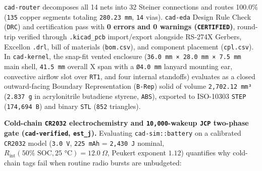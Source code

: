 \documentclass[10pt,letterpaper]{article}
\begin{document}
\texttt{cad-router} decomposes all 14 nets into 32 Steiner connections
and routes 100.0\% (\texttt{135} copper segments totaling
\texttt{280.23\ mm}, \texttt{14} vias). \texttt{cad-eda} Design Rule
Check (\texttt{DRC}) and certification pass with \textbf{0 errors and 0
warnings (\texttt{CERTIFIED})}, round-trip verified through
\texttt{.kicad\_pcb} import/export alongside RS-274X Gerbers, Excellon
\texttt{.drl}, bill of materials (\texttt{bom.csv}), and component
placement (\texttt{cpl.csv}). In \texttt{cad-kernel}, the snap-fit
vented enclosure (\texttt{36.\allowbreak{}0\ mm\ ×\ 28.\allowbreak{}0\ mm\ ×\ 7.\allowbreak{}5\ mm} main shell,
\texttt{41.5\ mm} overall X span with a \texttt{Ø4.0\ mm} lanyard
mounting ear, convective airflow slot over \texttt{RT1}, and four
internal standoffs) evaluates as a closed outward-facing Boundary
Representation (\texttt{B-Rep}) solid of volume \texttt{2,702.12\ mm³}
(\texttt{2.837\ g} in acrylonitrile butadiene styrene, \texttt{ABS}),
exported to ISO-10303 \texttt{STEP} (\texttt{174,694\ B}) and binary
\texttt{STL} (\texttt{852} triangles).

\textbf{Cold-chain \texttt{CR2032} electrochemistry and
\texttt{10,000}-wakeup \texttt{JCP} two-phase gate
(\texttt{cad-verified}, \texttt{est\_j}).} Evaluating
\texttt{cad-\allowbreak{}sim::battery} on a calibrated \texttt{CR2032} model
(\texttt{3.0\ V}, \texttt{225\ mAh} = \texttt{2,430\ J} nominal,
\(R_{\text{int}}(50\%\text{ SOC}, 25\text{ °C}) = 12.0\ \Omega\),
Peukert exponent \(1.12\)) quantifies why cold-chain tags fail when
routine radio bursts are unbudgeted:
\end{document}
